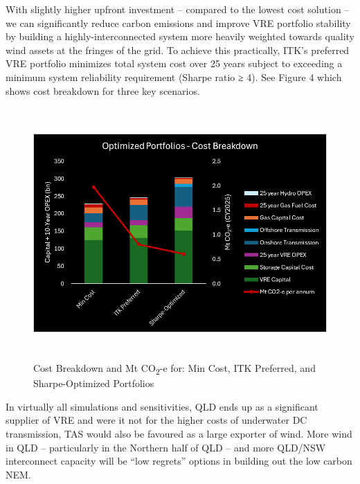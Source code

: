 \documentclass[
  letterpaper,
  DIV=11,
  numbers=noendperiod]{scrartcl}
\begin{document}
With slightly higher upfront investment -- compared to the lowest cost
solution -- we can significantly reduce carbon emissions and improve VRE
portfolio stability by building a highly-interconnected system more
heavily weighted towards quality wind assets at the fringes of the grid.
To achieve this practically, ITK's preferred VRE portfolio minimizes
total system cost over 25 years subject to exceeding a minimum system
reliability requirement (Sharpe ratio ≥ 4). See Figure 4 which shows
cost breakdown for three key scenarios.

\begin{figure}[H]

{\centering \includegraphics[width=5.57361in,height=3.77361in]{./media/media/image9.png}

}

\caption{Cost Breakdown and Mt CO\textsubscript{2}-e for: Min Cost, ITK
Preferred, and Sharpe-Optimized Portfolios}

\end{figure}%

In virtually all simulations and sensitivities, QLD ends up as a
significant supplier of VRE and were it not for the higher costs of
underwater DC transmission, TAS would also be favoured as a large
exporter of wind. More wind in QLD -- particularly in the Northern half
of QLD -- and more QLD/NSW interconnect capacity will be ``low regrets''
options in building out the low carbon NEM.
\end{document}
